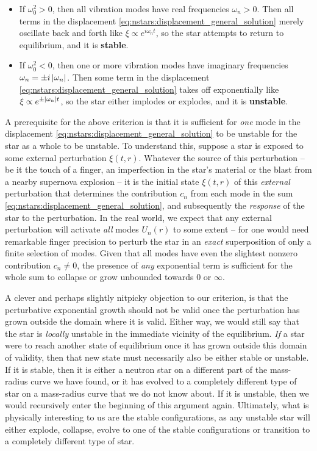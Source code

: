 \begin{itemize}
\item If $\omega_0^2 > 0$, then all vibration modes have real frequencies $\omega_n > 0$.
      Then all terms in the displacement \eqref{eq:nstars:displacement_general_solution} merely oscillate back and forth like $\xi \propto e^{i \omega_n t}$, so the star attempts to return to equilibrium, and it is \textbf{stable}.
\item If $\omega_0^2 < 0$, then one or more vibration modes have imaginary frequencies $\omega_n = \pm i \left\lvert \omega_n \right\rvert$.
      Then some term in the displacement \eqref{eq:nstars:displacement_general_solution} takes off exponentially like $\xi \propto e^{\pm \left\lvert \omega_n \right\rvert t}$, so the star either implodes or explodes, and it is \textbf{unstable}.
\end{itemize}
A prerequisite for the above criterion is that it is sufficient for \emph{one} mode in the displacement \eqref{eq:nstars:displacement_general_solution} to be unstable for the star as a whole to be unstable.
To understand this, suppose a star is exposed to some external perturbation $\xi(t,r)$.
Whatever the source of this perturbation -- be it the touch of a finger, an imperfection in the star's material or the blast from a nearby supernova explosion -- it is the initial state $\xi(t,r)$ of this \emph{external} perturbation that determines the contribution $c_n$ from each mode in the sum \eqref{eq:nstars:displacement_general_solution}, and subsequently the \emph{response} of the star to the perturbation.
In the real world, we expect that any external perturbation will activate \emph{all} modes $U_n(r)$ to some extent -- for one would need remarkable finger precision to perturb the star in an \emph{exact} superposition of only a finite selection of modes.
Given that all modes have even the slightest nonzero contribution $c_n \neq 0$, the presence of \emph{any} exponential term is sufficient for the whole sum to collapse or grow unbounded towards $0$ or $\infty$.

A clever and perhaps slightly nitpicky objection to our criterion, is that the perturbative exponential growth should not be valid once the perturbation has grown outside the domain where it is valid.
Either way, we would still say that the star is \emph{locally} unstable in the immediate vicinity of the equilibrium.
\emph{If} a star were to reach another state of equilibrium once it has grown outside this domain of validity, then that new state must necessarily also be either stable or unstable.
If it is stable, then it is either a neutron star on a different part of the mass-radius curve we have found, or it has evolved to a completely different type of star on a mass-radius curve that we do not know about.
If it is unstable, then we would recursively enter the beginning of this argument again.
Ultimately, what is physically interesting to us are the stable configurations, as any unstable star will either explode, collapse, evolve to one of the stable configurations or transition to a completely different type of star.

